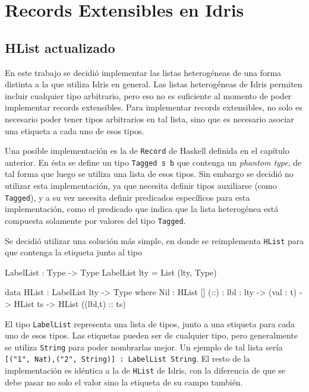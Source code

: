 
\chapter{Records Extensibles en Idris}
\label{ch:3}

\section{HList actualizado}

En este trabajo se decidió implementar las listas heterogéneas de una forma distinta a la que utiliza Idris en general. Las listas heterogéneas de Idris permiten incluir cualquier tipo arbitrario, pero eso no es suficiente al momento de poder implementar records extensibles. Para implementar records extensibles, no solo es necesario poder tener tipos arbitrarios en tal lista, sino que es necesario asociar una etiqueta a cada uno de esos tipos.

Una posible implementación es la de \texttt{Record} de Haskell definida en el capítulo anterior. En ésta se define un tipo \texttt{Tagged s b} que contenga un \textit{phantom type}, de tal forma que luego se utiliza una lista de esos tipos. Sin embargo se decidió no utilizar esta implementación, ya que necesita definir tipos auxiliarse (como \texttt{Tagged}), y a su vez necesita definir predicados específicos para esta implementación, como el predicado que indica que la lista heterogénea está compuesta solamente por valores del tipo \texttt{Tagged}.

Se decidió utilizar una solución más simple, en donde se reimplementa  \texttt{HList} para que contenga la etiqueta junto al tipo

\begin{code}
LabelList : Type -> Type
LabelList lty = List (lty, Type)

data HList : LabelList lty -> Type where
  Nil : HList []
  (::) : {lbl : lty} -> (val : t) -> HList ts -> 
    HList ((lbl,t) :: ts)
\end{code}

El tipo \texttt{LabelList} representa una lista de tipos, junto a una etiqueta para cada uno de esos tipos. Las etiquetas pueden ser de cualquier tipo, pero generalmente se utiliza \texttt{String} para poder nombrarlas mejor. Un ejemplo de tal lista sería \texttt{[("1", Nat),("2", String)] : LabelList String}.
El resto de la implementación es idéntica a la de \texttt{HList} de Idris, con la diferencia de que se debe pasar no solo el valor sino la etiqueta de su campo también.

